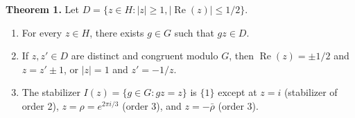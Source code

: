 \textbf{Theorem 1.} Let $D = \{z \in H : |z| \geq 1, |\operatorname{Re}(z)| \leq 1/2\}$.
\begin{enumerate}
\item[(1)] For every $z \in H$, there exists $g \in G$ such that $gz \in D$.
\item[(2)] If $z, z' \in D$ are distinct and congruent modulo $G$, then $\operatorname{Re}(z) = \pm 1/2$ and $z = z' \pm 1$, or $|z| = 1$ and $z' = -1/z$.
\item[(3)] The stabilizer $I(z) = \{g \in G : gz = z\}$ is $\{1\}$ except at $z = i$ (stabilizer of order 2), $z = \rho = e^{2\pi i/3}$ (order 3), and $z = -\bar{\rho}$ (order 3).
\end{enumerate}
